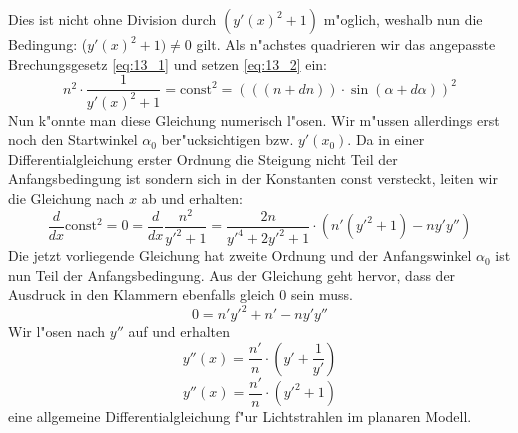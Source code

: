 \begin{refsection}
Dies ist nicht ohne Division durch $(y'(x)^2 + 1)$ m"oglich, weshalb nun die Bedingung: ($y'(x)^2 +1) \neq 0$ gilt.
Als n"achstes quadrieren wir das angepasste Brechungsgesetz \ref{eq:13_1} und setzen \ref{eq:13_2} ein:
$$n^2 \cdot \frac{1}{y'(x)^2 + 1} = \text{const}^2 = (((n + dn)) \cdot \sin(\alpha + d\alpha))^2$$
Nun k"onnte man diese Gleichung numerisch l"osen. 
Wir m"ussen allerdings erst noch den Startwinkel $\alpha_0$ ber"ucksichtigen bzw. $y'(x_0)$.
Da in einer Differentialgleichung erster Ordnung die Steigung nicht Teil der Anfangsbedingung ist sondern sich in der Konstanten $\text{const}$ versteckt, leiten wir die Gleichung nach $x$ ab und erhalten:
$$\frac{d}{dx} \text{const}^2 = 0 = \frac{d}{dx} \frac{n^2}{y'^2 + 1}  = \frac{2n}{y'^4 + 2y'^2 + 1} \cdot \left( n'(y'^2 + 1) - n y' y'' \right)$$
Die jetzt vorliegende Gleichung hat zweite Ordnung und der Anfangswinkel $\alpha_0$ ist nun Teil der Anfangsbedingung. 
Aus der Gleichung geht hervor, dass der Ausdruck in den Klammern ebenfalls gleich $0$ sein muss.
$$0 = n' y'^2 + n' - n y' y''$$
Wir l"osen nach $y''$ auf und erhalten 
$$y''(x) = \frac{n'}{n} \cdot \left( y' + \frac{1}{y'} \right)$$
\begin{equation} \label{eq:planar_DGL}
y''(x) = \frac{n'}{n} \cdot \left( y'^2 + 1\right)
\end{equation}
eine allgemeine Differentialgleichung f"ur Lichtstrahlen im planaren Modell.


\end{refsection}

